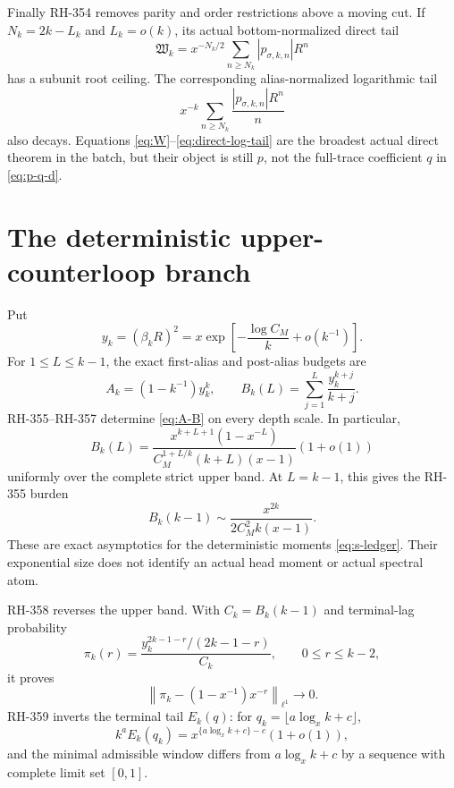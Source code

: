 \documentclass[11pt]{article}
\theoremstyle{definition}
\theoremstyle{remark}
\begin{document}
Finally RH-354 removes parity and order restrictions above a moving cut.  If
$N_k=2k-L_k$ and $L_k=o(k)$, its actual bottom-normalized direct tail
\begin{equation}\label{eq:W}
 \mathfrak W_k=x^{-N_k/2}\sum_{n\ge N_k}|p_{\sigma,k,n}|R^n
\end{equation}
has a subunit root ceiling.  The corresponding alias-normalized logarithmic
tail
\begin{equation}\label{eq:direct-log-tail}
 x^{-k}\sum_{n\ge N_k}\frac{|p_{\sigma,k,n}|R^n}{n}
\end{equation}
also decays.  Equations \eqref{eq:W}--\eqref{eq:direct-log-tail} are the
broadest actual direct theorem in the batch, but their object is still $p$,
not the full-trace coefficient $q$ in \eqref{eq:p-q-d}.

\section{The deterministic upper-counterloop branch}

Put
\begin{equation}\label{eq:x-y}
 y_k=(\beta_kR)^2
 =x\exp\left[-\frac{\log C_M}{k}+o(k^{-1})\right].
\end{equation}
For $1\le L\le k-1$, the exact first-alias and post-alias budgets are
\begin{equation}\label{eq:A-B}
 A_k=(1-k^{-1})y_k^k,\qquad
 B_k(L)=\sum_{j=1}^{L}\frac{y_k^{k+j}}{k+j}.
\end{equation}
RH-355--RH-357 determine \eqref{eq:A-B} on every depth scale.  In particular,
\begin{equation}\label{eq:complete-band}
 B_k(L)=
 \frac{x^{k+L+1}(1-x^{-L})}
 {C_M^{1+L/k}(k+L)(x-1)}(1+o(1))
\end{equation}
uniformly over the complete strict upper band.  At $L=k-1$, this gives the
RH-355 burden
\begin{equation}\label{eq:upper-burden}
 B_k(k-1)\sim\frac{x^{2k}}{2C_M^2k(x-1)}.
\end{equation}
These are exact asymptotics for the deterministic moments
\eqref{eq:s-ledger}.  Their exponential size does not identify an actual
head moment or actual spectral atom.

RH-358 reverses the upper band.  With $C_k=B_k(k-1)$ and terminal-lag
probability
\begin{equation}\label{eq:pi}
 \pi_k(r)=\frac{y_k^{2k-1-r}/(2k-1-r)}{C_k},
 \qquad0\le r\le k-2,
\end{equation}
it proves
\begin{equation}\label{eq:geometric}
 \left\|\pi_k-(1-x^{-1})x^{-r}\right\|_{\ell^1}\longrightarrow0.
\end{equation}
RH-359 inverts the terminal tail $E_k(q)$: for
$q_k=\lfloor a\log_xk+c\rfloor$,
\begin{equation}\label{eq:log-phase}
 k^aE_k(q_k)=x^{\{a\log_xk+c\}-c}(1+o(1)),
\end{equation}
and the minimal admissible window differs from $a\log_xk+c$ by a sequence
with complete limit set $[0,1]$.
\end{document}
